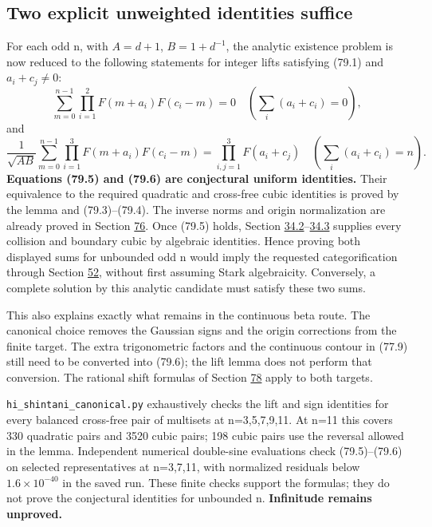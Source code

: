 \documentclass[11pt,reqno]{amsart}
\theoremstyle{plain}
\begin{document}
\subsection{Two explicit unweighted identities suffice}\label{sec:79.3}

For each odd n, with \(A=d+1\), \(B=1+d^{-1}\), the analytic
existence problem is now reduced to the following statements for
integer lifts satisfying (79.1) and \(a_i+c_j\ne0\):
\begin{equation*}
 \boxed{\displaystyle
 \sum_{m=0}^{n-1}\prod_{i=1}^2F(m+a_i)F(c_i-m)=0
 \quad (\textstyle\sum_i(a_i+c_i)=0),}
 \tag{79.5}
\end{equation*}
and
\begin{equation*}
 \boxed{\displaystyle
 \frac1{\sqrt{AB}}\sum_{m=0}^{n-1}
       \prod_{i=1}^3F(m+a_i)F(c_i-m)
 =\prod_{i,j=1}^3F(a_i+c_j)
 \quad (\textstyle\sum_i(a_i+c_i)=n).}
 \tag{79.6}
\end{equation*}
\textbf{Equations (79.5) and (79.6) are conjectural uniform identities.}
Their equivalence to the required quadratic and cross-free cubic
identities is proved by the lemma and (79.3)--(79.4). The inverse
norms and origin normalization are already proved in Section \hyperref[sec:76]{76}.
Once (79.5) holds, Section \hyperref[sec:34.2]{34.2}--\hyperref[sec:34.3]{34.3} supplies every collision
and boundary cubic by algebraic identities. Hence proving both
displayed sums for unbounded odd n would imply the requested
categorification through Section \hyperref[sec:52]{52}, without first assuming Stark
algebraicity. Conversely, a complete solution by this analytic
candidate must satisfy these two sums.

This also explains exactly what remains in the continuous beta
route. The canonical choice removes the Gaussian signs and the
origin corrections from the finite target. The extra trigonometric
factors and the continuous contour in (77.9) still need to be
converted into (79.6); the lift lemma does not perform that conversion.
The rational shift formulas of Section \hyperref[sec:78]{78} apply to both targets.

\texttt{hi\_\allowbreak shintani\_\allowbreak canonical.py} exhaustively checks the lift and sign
identities for every balanced cross-free pair of multisets at
n=3,5,7,9,11. At n=11 this covers 330 quadratic pairs and 3520
cubic pairs; 198 cubic pairs use the reversal allowed in the lemma.
Independent numerical double-sine evaluations check (79.5)--(79.6)
on selected representatives at n=3,7,11, with normalized residuals
below \(1.6\times10^{-40}\) in the saved run. These finite
checks support the formulas; they do not prove the conjectural
identities for unbounded n. \textbf{Infinitude remains unproved.}
\end{document}
